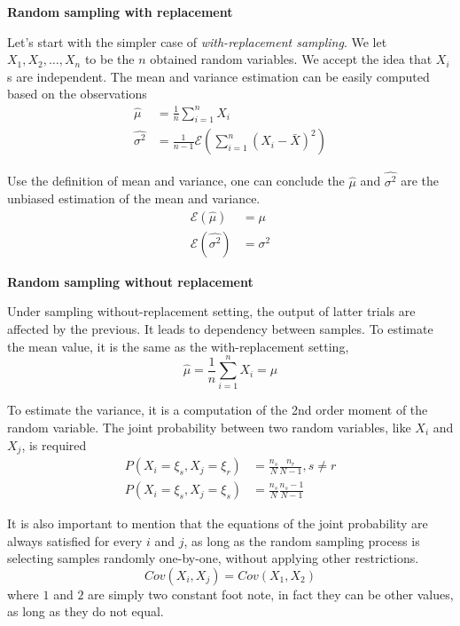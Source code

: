 \textbf{Random sampling with replacement}

Let's start with the simpler case of \emph{with-replacement sampling}.
We let $X_1, X_2, \dots, X_n$ to be the $n$ obtained random variables.
We accept the idea that $X_i$s are independent.
The mean and variance estimation can be easily computed based on the observations
\begin{align*}
    \hat{\mu}      & = \frac{1}{n} \sum_{i=1}^{n} X_i                              \\
    \hat{\sigma^2} & = \frac{1}{n-1} \mathcal{E}(\sum_{i=1}^{n} (X_i - \bar{X})^2)
\end{align*}

Use the definition of mean and variance,
one can conclude the $\hat{\mu}$ and $\hat{\sigma^2}$ are the unbiased estimation of the mean and variance.
\begin{align*}
    \mathcal{E}(\hat{\mu})      & = \mu      \\
    \mathcal{E}(\hat{\sigma^2}) & = \sigma^2
\end{align*}

\textbf{Random sampling without replacement}

Under sampling without-replacement setting, the output of latter trials are affected by the previous.
It leads to dependency between samples.
To estimate the mean value, it is the same as the with-replacement setting,
\begin{equation*}
    \hat{\mu} = \frac{1}{n} \sum_{i=1}^{n} X_i = \mu
\end{equation*}

To estimate the variance, it is a computation of the 2nd order moment of the random variable.
The joint probability between two random variables, like $X_i$ and $X_j$, is required
\begin{align*}
    P(X_i=\xi_s, X_j=\xi_r) & = \frac{n_s}{N} \frac{n_r}{N-1}, s \neq r \\
    P(X_i=\xi_s, X_j=\xi_s) & = \frac{n_s}{N} \frac{n_s-1}{N-1}
\end{align*}

It is also important to mention that the equations of the joint probability are always satisfied for every $i$ and $j$,
as long as the random sampling process is selecting samples randomly one-by-one, without applying other restrictions.
\begin{equation*}
    Cov(X_i, X_j) = Cov(X_1, X_2)
\end{equation*}
where $1$ and $2$ are simply two constant foot note,
in fact they can be other values,
as long as they do not equal.

